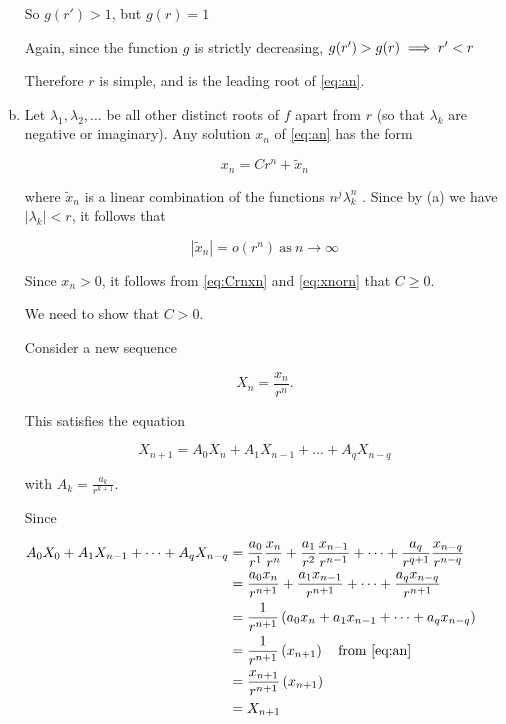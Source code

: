 \begin{theorem}
\begin{pf}
\begin{enumerate}[(a)]
So $g(r')>1$, but $g(r)=1$

Again, since the function $g$ is strictly decreasing, $g(r')>g(r)\implies r'<r$ 

Therefore $r$  is simple, and is the leading root of  \eqref{eq:an}.

\item Let $\lambda_1, \lambda_2, \dots$ be all other distinct roots of $f$ apart from $r$ (so that $\lambda_k$ are negative or imaginary). Any solution $x_n$ of \eqref{eq:an} has the form

\begin{equation} \label{eq:Crnxn}
x_n = Cr^n +\tilde{x}_n    
\end{equation}

where $\tilde{x}_n$ is a linear combination of the functions $n^j\lambda^n_k$ . Since by (a) we have $|\lambda_k| < r$, it follows that

\begin{equation} \label{eq:xnorn}
|\tilde{x}_n| = o(r^n) \ \text{as} \ n\to\infty    
\end{equation}

Since $x_n > 0$, it follows from \eqref{eq:Crnxn} and \eqref{eq:xnorn} that $C \geq 0$. 

We need to show that $C > 0$.

Consider a new sequence 

$$ X_n = \frac{x_n}{r^n}.$$

This satisfies the equation

\begin{equation} \label{eq:AkXk}
X_{n+1}=A_0X_n+A_1X_{n-1}+\dots+A_qX_{n-q}
\end{equation}

with $A_k = \frac{a_k}{r^{k+1}}$. 

Since

$\begin{aligned}
A_0X_0+A_1X_{n-1}+\dots+A_qX_{n-q} 
&= \frac{a_0}{r^1}\frac{x_n}{r^n} + \frac{a_1}{r^2}\frac{x_{n-1}}{r^{n-1}} +  \dots + \frac{a_q}{r^{q+1}}\frac{x_{n-q}}{r^{n-q}}\\
&= \frac{a_0x_n}{r^{n+1}} + \frac{a_1x_{n-1}}{r^{n+1}} + \dots + \frac{a_qx_{n-q}}{r^{n+1}}\\
&= \frac1{r^{n+1}}\left(a_0x_n+a_1x_{n-1}+\dots + a_qx_{n-q}\right)\\
&= \frac1{r^{n+1}}\left(x_{n+1}\right) \quad \text{from } \eqref{eq:an} \\
&= \frac{x_{n+1}}{r^{n+1}}\left(x_{n+1}\right) \\
&= X_{n+1}
\end{aligned}$


\end{enumerate}
\end{pf}
\end{theorem}
